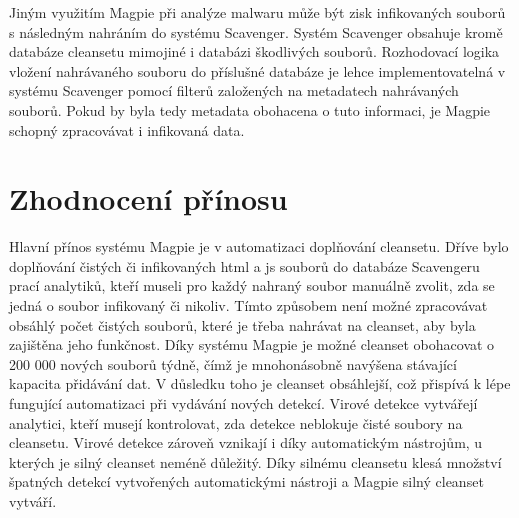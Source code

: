 \documentclass[thesis=M,czech,hidelinks]{FITthesis}[2013/05/06]
\begin{document}
Jiným využitím Magpie při analýze malwaru může být zisk infikovaných souborů s následným nahráním do systému Scavenger. Systém Scavenger obsahuje kromě databáze cleansetu mimojiné i databázi škodlivých souborů. Rozhodovací logika vložení nahrávaného souboru do příslušné databáze je lehce implementovatelná v systému Scavenger pomocí filterů založených na metadatech nahrávaných souborů. Pokud by byla tedy metadata obohacena o tuto informaci, je Magpie schopný zpracovávat i infikovaná data.



\section{Zhodnocení přínosu}
Hlavní přínos systému Magpie je v automatizaci doplňování cleansetu. Dříve bylo doplňování čistých či infikovaných html a js souborů do databáze Scavengeru prací analytiků, kteří museli pro každý nahraný soubor manuálně zvolit, zda se jedná o soubor infikovaný či nikoliv. Tímto způsobem není možné zpracovávat obsáhlý počet čistých souborů, které je třeba nahrávat na cleanset, aby byla zajištěna jeho funkčnost. Díky systému Magpie je možné cleanset obohacovat o 200 000 nových souborů týdně, čímž je mnohonásobně navýšena stávající kapacita přidávání dat. V důsledku toho je cleanset obsáhlejší, což přispívá k lépe fungující automatizaci při vydávání nových detekcí. Virové detekce vytvářejí analytici, kteří musejí kontrolovat, zda detekce neblokuje čisté soubory na cleansetu. Virové detekce zároveň vznikají i díky automatickým nástrojům, u kterých je silný cleanset neméně důležitý. Díky silnému cleansetu klesá množství špatných detekcí vytvořených automatickými nástroji a Magpie silný cleanset vytváří.









 \setlength{\parskip}{10pt}
\end{document}
